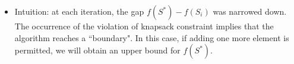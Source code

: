 \documentclass[mathserif]{beamer}
\begin{document}
{%
%
%
%
%
%
%
%
%
%          
%
%
%
%		 
	

\begin{itemize}
	\item Intuition: at each iteration, the gap $f(S^*) - f(S_i)$ was narrowed down. The occurrence of the violation of knapsack constraint implies that the algorithm reaches a ``boundary". In this case, if adding one more element is permitted, we will obtain an  upper bound for $f(S^*)$.
\end{itemize}

}
\end{document}
